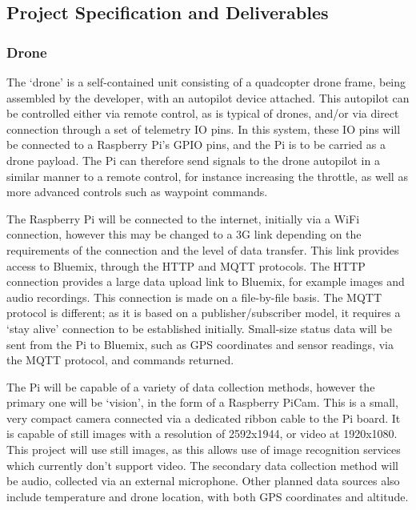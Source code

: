 \documentclass{article}
\begin{document}
\subsection{Project Specification and Deliverables}
\subsubsection{Drone}
The `drone' is a self-contained unit consisting of a quadcopter drone frame, being assembled by the developer, with an autopilot device attached. This autopilot can be controlled either via remote control, as is typical of drones, and/or via direct connection through a set of telemetry IO pins. In this system, these IO pins will be connected to a Raspberry Pi's GPIO pins, and the Pi is to be carried as a drone payload. The Pi can therefore send signals to the drone autopilot in a similar manner to a remote control, for instance increasing the throttle, as well as more advanced controls such as waypoint commands.

The Raspberry Pi will be connected to the internet, initially via a WiFi connection, however this may be changed to a 3G link depending on the requirements of the connection and the level of data transfer. This link provides access to Bluemix, through the HTTP and MQTT protocols. The HTTP connection provides a large data upload link to Bluemix, for example images and audio recordings. This connection is made on a file-by-file basis. The MQTT protocol is different; as it is based on a publisher/subscriber model, it requires a `stay alive' connection to be established initially. Small-size status data will be sent from the Pi to Bluemix, such as GPS coordinates and sensor readings, via the MQTT protocol, and commands returned.

The Pi will be capable of a variety of data collection methods, however the primary one will be `vision', in the form of a Raspberry PiCam. This is a small, very compact camera connected via a dedicated ribbon cable to the Pi board. It is capable of still images with a resolution of 2592x1944, or video at 1920x1080. This project will use still images, as this allows use of image recognition services which currently don't support video. The secondary data collection method will be audio, collected via an external microphone. Other planned data sources also include temperature and drone location, with both GPS coordinates and altitude.
\end{document}

